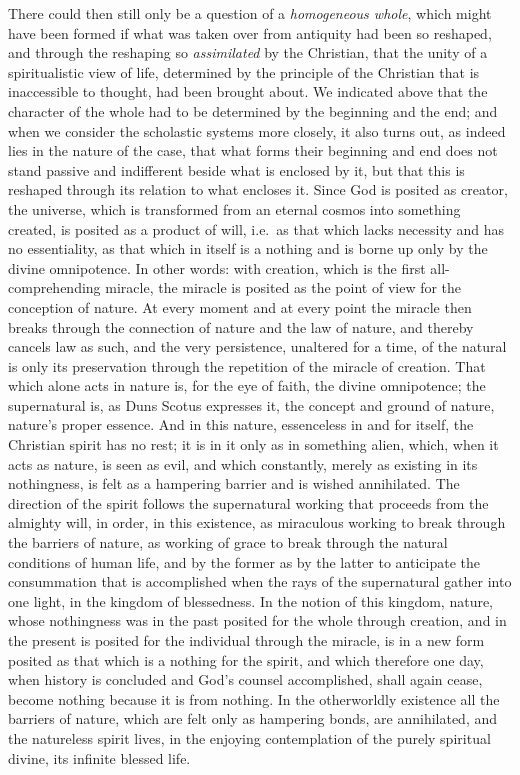 There could then still only be a question of a \emph{homogeneous whole}, which might have been formed if what was taken over from antiquity had been so reshaped, and through the reshaping so \emph{assimilated} by the Christian, that the unity of a spiritualistic view of life, determined by the principle of the Christian that is inaccessible to thought, had been brought about. We indicated above that the character of the whole had to be determined by the beginning and the end; and when we consider the scholastic systems more closely, it also turns out, as indeed lies in the nature of the case, that what forms their beginning and end does not stand passive and indifferent beside what is enclosed by it, but that this is reshaped through its relation to what encloses it. Since God is posited as creator, the universe, which is transformed from an eternal cosmos into something created, is posited as a product of will, i.e.\ as that which lacks necessity and has no essentiality, as that which in itself is a nothing and is borne up only by the divine omnipotence. In other words: with creation, which is the first all-comprehending miracle, the miracle is posited as the point of view for the conception of nature. At every moment and at every point the miracle then breaks through the connection of nature and the law of nature, and thereby cancels law as such, and the very persistence, unaltered for a time, of the natural is only its preservation through the repetition of the miracle of creation. That which alone acts in nature is, for the eye of faith, the divine omnipotence; the supernatural is, as Duns Scotus expresses it, the concept and ground of nature, nature's proper essence. And in this nature, essenceless in and for itself, the Christian spirit has no rest; it is in it only as in something alien, which, when it acts as nature, is seen as evil, and which constantly, merely as existing in its nothingness, is felt as a hampering barrier and is wished annihilated. The direction of the spirit follows the supernatural working that proceeds from the almighty will, in order, in this existence, as miraculous working to break through the barriers of nature, as working of grace to break through the natural conditions of human life, and by the former as by the latter to anticipate the consummation that is accomplished when the rays of the supernatural gather into one light, in the kingdom of blessedness. In the notion of this kingdom, nature, whose nothingness was in the past posited for the whole through creation, and in the present is posited for the individual through the miracle, is in a new form posited as that which is a nothing for the spirit, and which therefore one day, when history is concluded and God's counsel accomplished, shall again cease, become nothing because it is from nothing. In the otherworldly existence all the barriers of nature, which are felt only as hampering bonds, are annihilated, and the natureless spirit lives, in the enjoying contemplation of the purely spiritual divine, its infinite blessed life.

